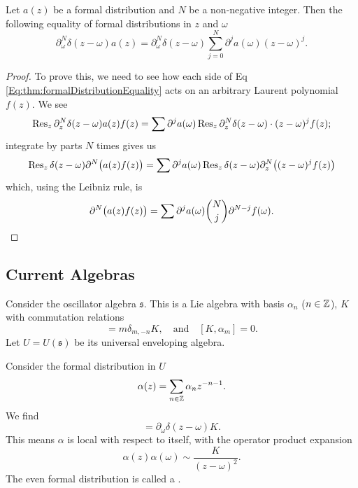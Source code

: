 \begin{thm}
Let $a(z)$ be a formal distribution and $N$ be a non-negative
integer. Then the following equality of formal distributions in $z$ and
$\omega$ 
\begin{equation}\label{Eq:thm:formalDistributionEquality}
\partial_{\omega}^{N}\delta(z-\omega)a(z)=\partial_{\omega}^{N}\delta(z-\omega)\sum^{N}_{j=0}\partial^{j}a(\omega)(z-\omega)^{j}.
\end{equation}
\end{thm}
\begin{proof}
To prove this, we need to see how each side of
Eq \eqref{Eq:thm:formalDistributionEquality} acts on an arbitrary
Laurent polynomial $f(z)$.
We see
\begin{equation}
\Res[z]{\partial_{z}^{N}\delta(z-\omega)a(z)f(z)}=\sum\partial^{j}a(\omega)\Res[z]{\partial_{z}^{N}\delta(z-\omega)\cdot(z-\omega)^{j}f(z)};
\end{equation}
integrate by parts $N$ times gives us
\begin{equation}
\Res[z]{\delta(z-\omega)\partial^{N}\bigl(a(z)f(z)\bigr)}
=\sum\partial^{j}a(\omega)\Res[z]{\delta(z-\omega)\partial_{z}^{N}\bigl((z-\omega)^{j}f(z)\bigr)}
\end{equation}
which, using the Leibniz rule, is
\begin{equation*}
\partial^{N}\bigl(a(z)f(z)\bigr)=\sum\partial^{j}a(\omega)\binom{N}{j}\partial^{N-j}f(\omega).\qedhere
\end{equation*}
\end{proof}

\subsection{Current Algebras}
\M
Consider the oscillator algebra $\mathfrak{s}$. This is a Lie algebra
with basis $\alpha_n$ ($n\in\ZZ$), $K$ with commutation relations
\begin{equation}
[\alpha_m,\alpha_n]=m\delta_{m,-n}K,\quad\mbox{and}\quad
[K,\alpha_m]=0.
\end{equation}
Let $U=U(\mathfrak{s})$ be its universal enveloping algebra.

\M
Consider the formal distribution in $U$
\begin{equation}
\alpha(z)=\sum_{n\in\ZZ}\alpha_nz^{-n-1}.
\end{equation}
We find
\begin{equation}
[\alpha(z),\alpha(\omega)]=\partial_{\omega}\delta(z-\omega)K.
\end{equation}
This means $\alpha$ is local with respect to itself, with the operator
product expansion
\begin{equation}
\alpha(z)\alpha(\omega)\sim\frac{K}{(z-\omega)^{2}}.
\end{equation}
The even formal distribution is called a .

